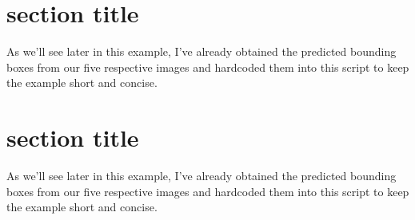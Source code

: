 \section{section title}
As we’ll see later in this example, I’ve already obtained the 
predicted bounding boxes from our five respective images and 
hardcoded them into this script to keep the example short and 
concise.


\section{section title}
As we’ll see later in this example, I’ve already obtained the 
predicted bounding boxes from our five respective images and 
hardcoded them into this script to keep the example short and
 concise.